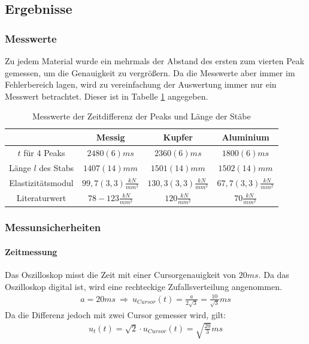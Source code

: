 \documentclass[11pt, a4paper]{article}
\begin{document}
    \subsection{Ergebnisse}
    \subsubsection{Messwerte}
    Zu jedem Material wurde ein mehrmals der Abstand des ersten zum
    vierten Peak gemessen, um die Genauigkeit zu vergrößern. Da die Messwerte aber immer im Fehlerbereich lagen,
    wird zu vereinfachung der Auswertung immer nur ein Messwert betrachtet. Dieser ist in Tabelle \ref{ex:mess1}
    angegeben. 
    \begin{table}[]
        \centering
        \begin{tabular}{c | c | c | c}
           & Messig & Kupfer & Aluminium \\ \hline
            $ t $ für 4 Peaks & $ 2480(6)ms $ & $ 2360(6)ms $ & $ 1800(6)ms $ \\ \hline
            Länge $l$ des Stabs & $1407(14)mm$ & $1501(14)mm$ & $1502(14)mm$ \\ \hline
            Elastizitätsmodul & $99,7(3,3)\frac{kN}{mm^2}$ & $130,3(3,3)\frac{kN}{mm^2}$ & $67,7(3,3)\frac{kN}{mm^2}$ \\ \hline
            Literaturwert & $78-123\frac{kN}{mm^2}$ & $120\frac{kN}{mm^2}$ & $70\frac{kN}{mm^2}$
        \end{tabular}
        \caption{Messwerte der Zeitdifferenz der Peaks und Länge der  Stäbe}
        \label{ex:mess1}
    \end{table}
    \subsubsection{Messunsicherheiten}
    \paragraph{Zeitmessung}
    Das Oszilloskop misst die Zeit mit einer Cursorgenauigkeit von $ 20ms $. Da das Oszilloskop digital ist, wird
    eine rechteckige Zufallsverteilung angenommen.
    \begin{align}
        a = 20ms \ \Rightarrow \ u_{Cursor}(t) = \frac{a}{2 \sqrt{3}} = \frac{10}{\sqrt{3}}ms
    \end{align}
    Da die Differenz jedoch mit zwei Cursor gemesser wird, gilt:
    \begin{align} \label{eqt}
        u_{t}(t) = \sqrt{2} \cdot u_{Cursor}(t) = \sqrt{\frac{20}{3}}ms
    \end{align}
\end{document}
